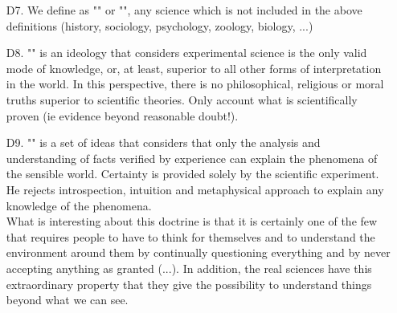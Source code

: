 \begin{itemize}
	\item[D7.] We define as "" or "", any science which is not included in the above definitions (history, sociology, psychology, zoology, biology, ...) 

	\item[D8.] "" is an ideology that considers experimental science is the only valid mode of knowledge, or, at least, superior to all other forms of interpretation in the world. In this perspective, there is no philosophical, religious or moral truths superior to scientific theories. Only account what is scientifically proven (ie evidence beyond reasonable doubt!). 

	\item[D9.] "" is a set of ideas that considers that only the analysis and understanding of facts verified by experience can explain the phenomena of the sensible world. Certainty is provided solely by the scientific experiment. He rejects introspection, intuition and metaphysical approach to explain any knowledge of the phenomena. \\
	
	What is interesting about this doctrine is that it is certainly one of the few that requires people to have to think for themselves and to understand the environment around them by continually questioning everything and by never accepting anything as granted (...). In addition, the real sciences have this extraordinary property that they give the possibility to understand things beyond what we can see. 
\end{itemize}

